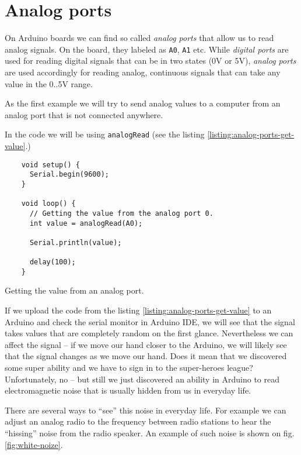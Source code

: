 \documentclass[../sparc.tex]{subfiles}
\begin{document}
\section{Analog ports}
\label{section:analog-ports}

On Arduino boards we can find so called \emph{analog ports} that allow us to
read analog signals.  On the board, they labeled as \texttt{A0}, \texttt{A1}
etc.  While \emph{digital ports} are used for reading digital signals that can
be in two states (0V or 5V), \emph{analog ports} are used accordingly for
reading analog, continuous signals that can take any value in the 0..5V range.

As the first example we will try to send analog values to a computer from an
analog port that is not connected anywhere.

In the code we will be using \texttt{analogRead} (see the listing
\ref{listing:analog-ports-get-value}.)

\begin{listing}[ht]
  \begin{verbatim}
    void setup() {
      Serial.begin(9600);
    }

    void loop() {
      // Getting the value from the analog port 0.
      int value = analogRead(A0);

      Serial.println(value);

      delay(100);
    }
  \end{verbatim}
  \label{listing:analog-ports-get-value}
  \caption{Getting the value from an analog port.}
\end{listing}

If we upload the code from the listing \ref{listing:analog-ports-get-value} to
an Arduino and check the serial monitor in Arduino IDE, we will see that the
signal takes values that are completely random on the first glance.
Nevertheless we can affect the signal -- if we move our hand closer to the
Arduino, we will likely see that the signal changes as we move our hand.  Does
it mean that we discovered some super ability and we have to sign in to the
super-heroes league?  Unfortunately, no -- but still we just discovered an
ability in Arduino to read electromagnetic noise that is usually hidden from us
in everyday life.

There are several ways to ``see'' this noise in everyday life.  For example we
can adjust an analog radio to the frequency between radio stations to hear the
``hissing'' noise from the radio speaker.  An example of such noise is shown on
fig. \ref{fig:white-noize}.
\end{document}
